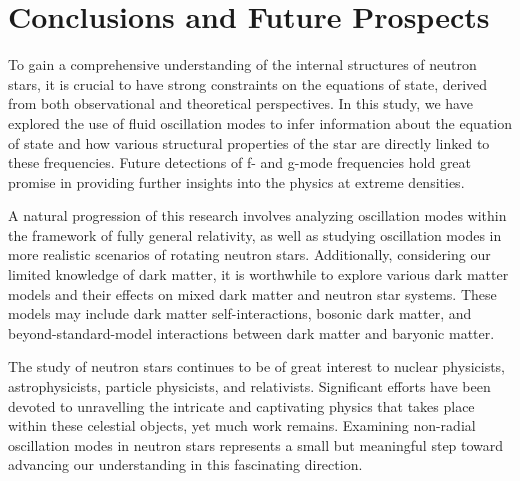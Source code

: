 \documentclass[a4paper,12pt,onehalfspacing]{report}
\newcommand\emptypage{
    \newpage
    \null
    \thispagestyle{empty}
    }
\begin{document}
\FloatBarrier
\section{Conclusions and Future Prospects}

To gain a comprehensive understanding of the internal structures of neutron stars, it is crucial to have strong constraints on the equations of state, derived from both observational and theoretical perspectives. In this study, we have explored the use of fluid oscillation modes to infer information about the equation of state and how various structural properties of the star are directly linked to these frequencies. Future detections of f- and g-mode frequencies hold great promise in providing further insights into the physics at extreme densities.

A natural progression of this research involves analyzing oscillation modes within the framework of fully general relativity, as well as studying oscillation modes in more realistic scenarios of rotating neutron stars. Additionally, considering our limited knowledge of dark matter, it is worthwhile to explore various dark matter models and their effects on mixed dark matter and neutron star systems. These models may include dark matter self-interactions, bosonic dark matter, and beyond-standard-model interactions between dark matter and baryonic matter.

The study of neutron stars continues to be of great interest to nuclear physicists, astrophysicists, particle physicists, and relativists. Significant efforts have been devoted to unravelling the intricate and captivating physics that takes place within these celestial objects, yet much work remains. Examining non-radial oscillation modes in neutron stars represents a small but meaningful step toward advancing our understanding in this fascinating direction. 


\emptypage


\end{document}
